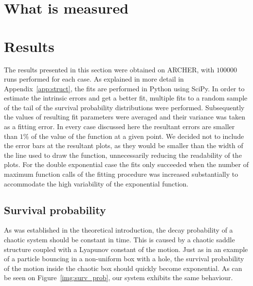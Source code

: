 \documentclass[11pt,a4paper]{article}
\begin{document}
\section{What is measured}


\section{Results}
The results presented in this section were obtained on ARCHER, with $100000$ runs performed for each case.
As explained in more detail in Appendix~\ref{app:struct}, the fits are performed in Python using SciPy.
In order to estimate the intrinsic errors and get a better fit, multiple fits to a random sample of the tail of the survival probability distributions were performed.
Subsequently the values of resulting fit parameters were averaged and their variance was taken as a fitting error.
In every case discussed here the resultant errors are smaller than $1\%$ of the value of the function at a given point.
We decided not to include the error bars at the resultant plots, as they would be smaller than the width of the line used to draw the function, unnecessarily reducing the readability of the plots.
For the double exponential case the fits only succeeded when the number of maximum function calls of the fitting procedure was increased substantially to accommodate the high variability of the exponential function.


\subsection{Survival probability}
As was established in the theoretical introduction, the decay probability of a chaotic system should be constant in time.
This is caused by a chaotic saddle structure coupled with a Lyapunov constant of the motion.
Just as in an example of a particle bouncing in a non-uniform box with a hole, the survival probability of the motion inside the chaotic box should quickly become exponential.
As can be seen on Figure~\ref{img:surv_prob}, our system exhibits the same behaviour.
\end{document}
